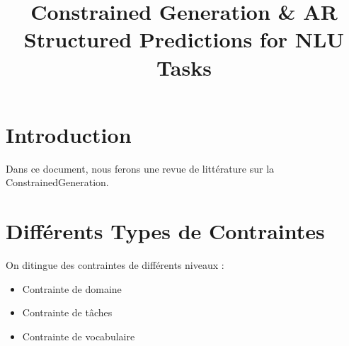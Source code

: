 \documentclass[9pt]{article}
\title{Constrained Generation \& AR Structured Predictions for NLU Tasks}
\providecommand{\tightlist}{%
  \setlength{\itemsep}{0pt}\setlength{\parskip}{0pt}}
\begin{document}
\maketitle

\section{Introduction}

Dans ce document, nous ferons une revue de littérature sur la \gls{ConstrainedGeneration}. 







\section{Différents Types de Contraintes}\label{differents-types-de-contraintes}

On ditingue des contraintes de différents niveaux :

\begin{itemize}
\tightlist
\item Contrainte de domaine
\item Contrainte de tâches
\item Contrainte de vocabulaire
\end{itemize}
\end{document}
